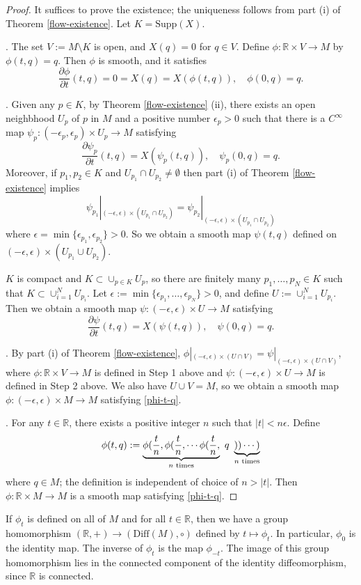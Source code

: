 \documentclass{amsart}
\numberwithin{equation}{section}
\newcommand{\bR}{\mathbb{R}}
\newcommand{\ep}{\epsilon}
\theoremstyle{definition}
\theoremstyle{theorem}
\begin{document}
\begin{proof} It suffices to prove the existence; the uniqueness follows from part (i) of Theorem \ref{flow-existence}. 
Let $K=\mathrm{Supp}(X)$.

. The set $V:= M\setminus K$ is open, and $X(q)=0$ for $q\in V$. Define
$\phi: \bR\times V \to M$ by $\phi(t,q)=q$. Then $\phi$ is smooth, and it satisfies
$$
\frac{\partial \phi}{\partial t}(t,q)=0 = X(q)= X(\phi(t,q)),\quad \phi(0,q)=q.
$$

. Given any $p\in K$, by Theorem \ref{flow-existence} (ii), there exists an open neighbhood $U_p$ of $p$ in $M$ and a positive number $\ep_p>0$ such that
there is a $C^\infty$ map $\psi_p:(-\ep_p,\ep_p)\times U_p\to M$ satisfying
$$
\frac{\partial \psi_p}{\partial t}(t,q) = X(\psi_p(t,q)),\quad \psi_p(0,q) = q.
$$ 
Moreover, if $p_1,p_2\in K$ and $U_{p_1}\cap U_{p_2}\neq \emptyset$ then part (i) of Theorem \ref{flow-existence} implies
$$
\psi_{p_1}|_{(-\ep,\ep)\times (U_{p_1}\cap U_{p_2})}= \psi_{p_2}|_{(-\ep,\ep)\times (U_{p_1}\cap U_{p_2}) }
$$
where $\ep=\min\{\ep_{p_1},\ep_{p_2}\}>0$. So we obtain a smooth map 
$\psi(t,q)$ defined on $(-\ep,\ep)\times (U_{p_1}\cup U_{p_2})$. 

$K$ is compact and $K\subset \cup_{p\in K}U_p$, so there are finitely many $p_1,\ldots, p_N \in K$ such that
$K\subset \cup_{i=1}^N U_{p_i}$. Let $\ep:= \min\{\ep_{p_1},\ldots,\ep_{p_N}\} >0$, and define
$U:= \cup_{i=1}^N U_{p_i}$. Then we obtain a smooth map $\psi: (-\ep,\ep)\times U \to M$ satisfying 
$$
\frac{\partial \psi}{\partial t}(t,q) = X(\psi(t,q)),\quad \psi(0,q) = q.
$$


. By part (i) of Theorem \ref{flow-existence}, $\phi|_{(-\ep,\ep)\times (U\cap V)} = \psi|_{(-\ep,\ep)\times (U\cap V)}$, where
$\phi:\bR\times V\to M$ is defined in Step 1 above  and $\psi:(-\ep,\ep)\times U\to M$ is defined in Step 2 above.
We also have $U\cup V=M$, so we obtain a smooth map $\phi: (-\ep,\ep)\times M\to M$
satisfying \eqref{phi-t-q}.

. For any $t\in \bR$, there exists a positive integer $n$ such that $|t|< n \ep$. Define
$$
\phi(t,q) := \underbrace{\phi(\frac{t}{n}, \phi(\frac{t}{n}, \cdots \phi(\frac{t}{n},}_{n\textup{ times}}\ q\  
\underbrace{))\cdots)}_{n\textup{ times}}
$$
where $q\in M$; the definition is independent of choice of $n>|t|$.  Then
$\phi:\bR\times M\to M$ is a smooth map satisfying \eqref{phi-t-q}.  
\end{proof}

If $\phi_t$ is defined on all of $M$ and for all $t \in \bR$, then we have a group homomorphism 
$(\bR, +) \to (\text{Diff}(M), \circ)$ defined by $t \mapsto \phi_t$. In particular, $\phi_0$ is the identity map. 
The inverse of $\phi_t$ is the map $\phi_{-t}$. The image of this group homomorphism lies in the connected component of the 
identity diffeomorphism, since $\bR$ is connected. 
\end{document}
